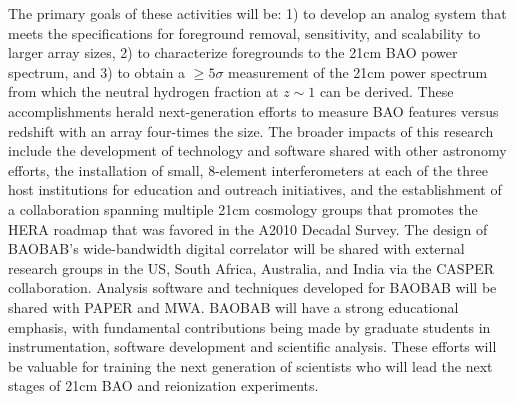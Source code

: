\documentclass[11pt]{article}
\begin{document}
The primary goals of these activities
will be: 1) to develop an analog system that meets the specifications
for foreground removal, sensitivity, and scalability 
to larger array sizes, 2) to characterize foregrounds to the 21cm BAO power spectrum,
and 3) to obtain a $\ge5\sigma$ measurement of the 21cm power 
spectrum from which the neutral hydrogen fraction
at $z\sim1$ can be derived.  These accomplishments herald next-generation efforts to 
measure BAO features versus redshift with an array four-times the size.
The broader impacts of this research include the development of technology and software
shared with other astronomy efforts, the installation of
small, 8-element interferometers at each of the three host institutions for education and
outreach initiatives, and the establishment of a
collaboration spanning multiple 21cm cosmology groups that promotes
the HERA roadmap that was favored in the A2010 Decadal Survey.
The design of BAOBAB's wide-bandwidth digital correlator 
will be shared with external research groups in the US, South Africa, Australia, and
India via the CASPER collaboration.  Analysis software and techniques developed for BAOBAB will
be shared with PAPER and MWA.
BAOBAB will have a strong educational emphasis, with
fundamental contributions being made by graduate students 
in instrumentation, software development and scientific analysis.
These efforts will be valuable for training the next generation of
scientists who will lead the next stages of 21cm BAO and reionization experiments.
\end{document}
